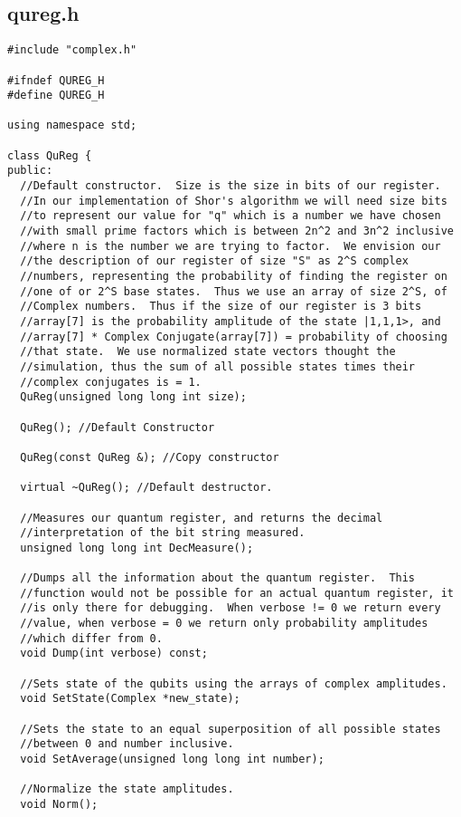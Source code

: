 \documentclass[]{article}
\begin{document}
\subsection{qureg.h}
\begin{verbatim}
#include "complex.h"

#ifndef QUREG_H
#define QUREG_H

using namespace std;

class QuReg {
public:
  //Default constructor.  Size is the size in bits of our register.
  //In our implementation of Shor's algorithm we will need size bits
  //to represent our value for "q" which is a number we have chosen
  //with small prime factors which is between 2n^2 and 3n^2 inclusive
  //where n is the number we are trying to factor.  We envision our
  //the description of our register of size "S" as 2^S complex
  //numbers, representing the probability of finding the register on
  //one of or 2^S base states.  Thus we use an array of size 2^S, of
  //Complex numbers.  Thus if the size of our register is 3 bits
  //array[7] is the probability amplitude of the state |1,1,1>, and
  //array[7] * Complex Conjugate(array[7]) = probability of choosing
  //that state.  We use normalized state vectors thought the
  //simulation, thus the sum of all possible states times their
  //complex conjugates is = 1.
  QuReg(unsigned long long int size); 

  QuReg(); //Default Constructor

  QuReg(const QuReg &); //Copy constructor

  virtual ~QuReg(); //Default destructor.
  
  //Measures our quantum register, and returns the decimal
  //interpretation of the bit string measured.
  unsigned long long int DecMeasure(); 
  
  //Dumps all the information about the quantum register.  This
  //function would not be possible for an actual quantum register, it
  //is only there for debugging.  When verbose != 0 we return every
  //value, when verbose = 0 we return only probability amplitudes
  //which differ from 0.
  void Dump(int verbose) const;

  //Sets state of the qubits using the arrays of complex amplitudes.
  void SetState(Complex *new_state);

  //Sets the state to an equal superposition of all possible states
  //between 0 and number inclusive.
  void SetAverage(unsigned long long int number);

  //Normalize the state amplitudes.
  void Norm(); 
  

\end{verbatim}
\end{document}
